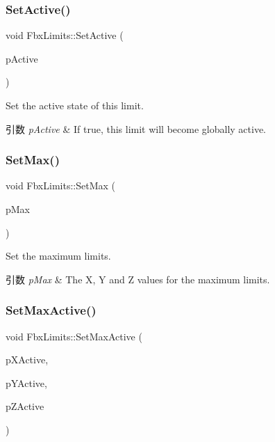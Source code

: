\mbox{\label{class_fbx_limits_a9250fab25f1f8cf5e64651073ad8a327}} 
\subsubsection{\texorpdfstring{Set\+Active()}{SetActive()}}
{\footnotesize\ttfamily void Fbx\+Limits\+::\+Set\+Active (\begin{DoxyParamCaption}\item[{const bool}]{p\+Active }\end{DoxyParamCaption})}

Set the active state of this limit. 
\begin{DoxyParams}{引数}
{\em p\+Active} & If true, this limit will become globally active. \\
\hline
\end{DoxyParams}
\mbox{\label{class_fbx_limits_ab3af1af72a0c006c836a9684cc66af27}} 
\subsubsection{\texorpdfstring{Set\+Max()}{SetMax()}}
{\footnotesize\ttfamily void Fbx\+Limits\+::\+Set\+Max (\begin{DoxyParamCaption}\item[{const \hyperlink{fbxtypes_8h_ae0a96f14cde566774c7553aa7523b7a7}{Fbx\+Double3} \&}]{p\+Max }\end{DoxyParamCaption})}

Set the maximum limits. 
\begin{DoxyParams}{引数}
{\em p\+Max} & The X, Y and Z values for the maximum limits. \\
\hline
\end{DoxyParams}
\mbox{\label{class_fbx_limits_adb51ef228a31741ab0ad20a5a83d4ab6}} 
\subsubsection{\texorpdfstring{Set\+Max\+Active()}{SetMaxActive()}}
{\footnotesize\ttfamily void Fbx\+Limits\+::\+Set\+Max\+Active (\begin{DoxyParamCaption}\item[{bool}]{p\+X\+Active,  }\item[{bool}]{p\+Y\+Active,  }\item[{bool}]{p\+Z\+Active }\end{DoxyParamCaption})}

